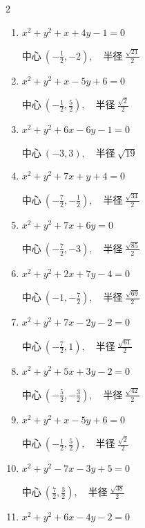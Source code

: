 \begin{multicols}{2}
\begin{enumerate}
  \item $x^{2}+y^{2}+x+4y-1=0$

        $\displaystyle 中心\: \left(-\frac{1}{2},-2\right), \quad 半径 \ \frac{\sqrt{21}}{2}$

  \item $x^{2}+y^{2}+x-5y+6=0$

        $\displaystyle 中心\: \left(-\frac{1}{2},\frac{5}{2}\right), \quad 半径 \ \frac{\sqrt{2}}{2}$

  \item $x^{2}+y^{2}+6x-6y-1=0$

        $\displaystyle 中心\: \left(-3,3\right), \quad 半径 \ \sqrt{19}$

  \item $x^{2}+y^{2}+7x+y+4=0$

        $\displaystyle 中心\: \left(-\frac{7}{2},-\frac{1}{2}\right), \quad 半径 \ \frac{\sqrt{34}}{2}$

  \item $x^{2}+y^{2}+7x+6y=0$

        $\displaystyle 中心\: \left(-\frac{7}{2},-3\right), \quad 半径 \ \frac{\sqrt{85}}{2}$

  \item $x^{2}+y^{2}+2x+7y-4=0$

        $\displaystyle 中心\: \left(-1,-\frac{7}{2}\right), \quad 半径 \ \frac{\sqrt{69}}{2}$

  \item $x^{2}+y^{2}+7x-2y-2=0$

        $\displaystyle 中心\: \left(-\frac{7}{2},1\right), \quad 半径 \ \frac{\sqrt{61}}{2}$

  \item $x^{2}+y^{2}+5x+3y-2=0$

        $\displaystyle 中心\: \left(-\frac{5}{2},-\frac{3}{2}\right), \quad 半径 \ \frac{\sqrt{42}}{2}$

  \item $x^{2}+y^{2}+x-5y+6=0$

        $\displaystyle 中心\: \left(-\frac{1}{2},\frac{5}{2}\right), \quad 半径 \ \frac{\sqrt{2}}{2}$

  \item $x^{2}+y^{2}-7x-3y+5=0$

        $\displaystyle 中心\: \left(\frac{7}{2},\frac{3}{2}\right), \quad 半径 \ \frac{\sqrt{38}}{2}$

  \item $x^{2}+y^{2}+6x-4y-2=0$


\end{enumerate}
\end{multicols}
